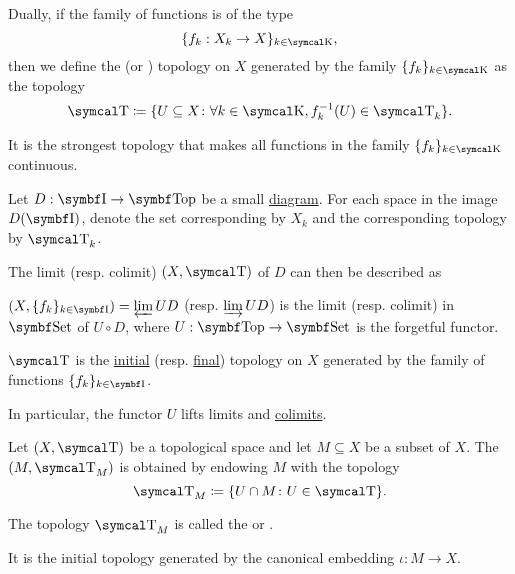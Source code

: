 \begin{definition}\label{def:final_topology}
  Dually, if the family of functions is of the type
  \begin{equation*}
    \{ f_k: X_k \to X \}_{k \in \CK},
  \end{equation*}
  then we define the  (or ) topology on \( X \) generated by the family \( \{ f_k \}_{k \in \CK} \) as the topology
  \begin{equation*}
    \CT \coloneqq \{ U \subseteq X \colon \forall k \in \CK, f_k^{-1}(U) \in \CT_k \}.
  \end{equation*}

  It is the strongest topology that makes all functions in the family \( \{ f_k \}_{k \in \CK} \) continuous.
\end{definition}

\begin{proposition}\label{thm:initial_final_topology_limit}
  Let \( D: \Bold I \to \Cat{Top} \) be a small \hyperref[def:categorical_diagram]{diagram}. For each space in the image \( D(\Bold I) \), denote the set corresponding by \( X_k \) and the corresponding topology by \( \CT_k \).

  The limit (resp. colimit) \( (X, \CT) \) of \( D \) can then be described as
  \begin{DefEnum}
    \item \( (X, \{ f_k \}_{k \in \Cat{I}}) = \varprojlim UD \) (resp. \( \varinjlim UD \)) is the limit (resp. colimit) in \( \Cat{Set} \) of \( U \circ D \), where \( U: \Bold{Top} \to \Cat{Set} \) is the forgetful functor.
    \item \( \CT \) is the \hyperref[def:initial_topology]{initial} (resp. \hyperref[def:final_topology]{final}) topology on \( X \) generated by the family of functions \( \{ f_k \}_{k \in \Cat{I}} \).
  \end{DefEnum}

  In particular, the functor \( U \) lifts limits and \hyperref[def:categorical_limit_preservation/lift]{colimits}.
\end{proposition}

\begin{definition}\label{def:topological_subspace}
  Let \( (X, \CT) \) be a topological space and let \( M \subseteq X \) be a subset of \( X \). The  \( (M, \CT_M) \) is obtained by endowing \( M \) with the topology
  \begin{equation*}
    \CT_M \coloneqq \{ U \cap M \colon U \in \CT \}.
  \end{equation*}

  The topology \( \CT_M \) is called the  or .

  It is the initial topology generated by the canonical embedding \( \iota: M \to X \).
\end{definition}

